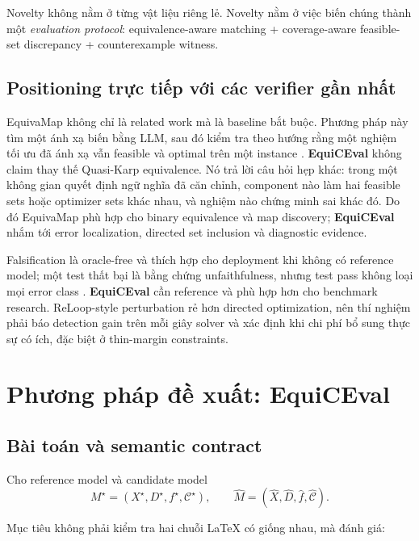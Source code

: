 \documentclass[11pt,a4paper]{article}
\newcommand{\method}{\textsf{\textbf{EquiCEval}}\xspace}
\begin{document}
\begin{takeaway}
Novelty không nằm ở từng vật liệu riêng lẻ. Novelty nằm ở việc biến chúng thành một \emph{evaluation protocol}: equivalence-aware matching + coverage-aware feasible-set discrepancy + counterexample witness.
\end{takeaway}

\subsection*{Positioning trực tiếp với các verifier gần nhất}

EquivaMap không chỉ là related work mà là baseline bắt buộc. Phương pháp này
tìm một ánh xạ biến bằng LLM, sau đó kiểm tra theo hướng rằng một nghiệm tối ưu
đã ánh xạ vẫn feasible và optimal trên một instance
\parencite{zhai2025equivamap}. \method không claim thay thế Quasi-Karp
equivalence. Nó trả lời câu hỏi hẹp khác: trong một không gian quyết định ngữ
nghĩa đã căn chỉnh, component nào làm hai feasible sets hoặc optimizer sets
khác nhau, và nghiệm nào chứng minh sai khác đó. Do đó EquivaMap phù hợp cho
binary equivalence và map discovery; \method nhắm tới error localization,
directed set inclusion và diagnostic evidence.

Falsification là oracle-free và thích hợp cho deployment khi không có reference
model; một test thất bại là bằng chứng unfaithfulness, nhưng test pass không
loại mọi error class \parencite{li2026falsification}. \method cần reference và
phù hợp hơn cho benchmark research. ReLoop-style perturbation
\parencite{lian2026reloop} rẻ hơn directed optimization, nên thí nghiệm phải
báo detection gain trên mỗi giây solver và xác định khi chi phí bổ sung thực sự
có ích, đặc biệt ở thin-margin constraints.

\section{Phương pháp đề xuất: \method}

\subsection{Bài toán và semantic contract}

Cho reference model và candidate model
\[
M^\star=(X^\star,D^\star,f^\star,\mathcal C^\star),
\qquad
\widehat M=(\widehat X,\widehat D,\widehat f,\widehat{\mathcal C}).
\]

Mục tiêu không phải kiểm tra hai chuỗi LaTeX có giống nhau, mà đánh giá:
\end{document}

